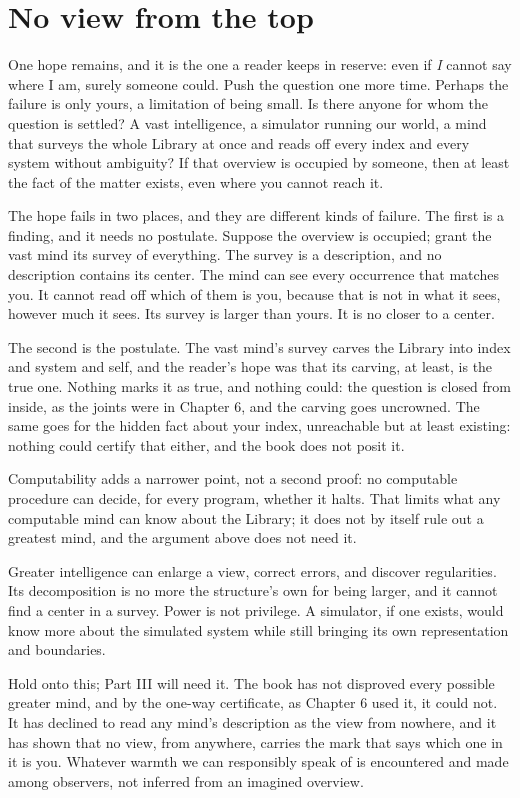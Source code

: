 \section*{No view from the top}

One hope remains, and it is the one a reader keeps in reserve: even if \emph{I} cannot say where I am, surely someone could. Push the question one more time. Perhaps the failure is only yours, a limitation of being small. Is there anyone for whom the question is settled? A vast intelligence, a simulator running our world, a mind that surveys the whole Library at once and reads off every index and every system without ambiguity? If that overview is occupied by someone, then at least the fact of the matter exists, even where you cannot reach it.

The hope fails in two places, and they are different kinds of failure. The first is a finding, and it needs no postulate. Suppose the overview is occupied; grant the vast mind its survey of everything. The survey is a description, and no description contains its center. The mind can see every occurrence that matches you. It cannot read off which of them is you, because that is not in what it sees, however much it sees. Its survey is larger than yours. It is no closer to a center.

The second is the postulate. The vast mind's survey carves the Library into index and system and self, and the reader's hope was that its carving, at least, is the true one. Nothing marks it as true, and nothing could: the question is closed from inside, as the joints were in Chapter 6, and the carving goes uncrowned. The same goes for the hidden fact about your index, unreachable but at least existing: nothing could certify that either, and the book does not posit it.

Computability adds a narrower point, not a second proof: no computable procedure can decide, for every program, whether it halts. That limits what any computable mind can know about the Library; it does not by itself rule out a greatest mind, and the argument above does not need it.

Greater intelligence can enlarge a view, correct errors, and discover regularities. Its decomposition is no more the structure's own for being larger, and it cannot find a center in a survey. Power is not privilege. A simulator, if one exists, would know more about the simulated system while still bringing its own representation and boundaries.

Hold onto this; Part III will need it. The book has not disproved every possible greater mind, and by the one-way certificate, as Chapter 6 used it, it could not. It has declined to read any mind's description as the view from nowhere, and it has shown that no view, from anywhere, carries the mark that says which one in it is you. Whatever warmth we can responsibly speak of is encountered and made among observers, not inferred from an imagined overview.

